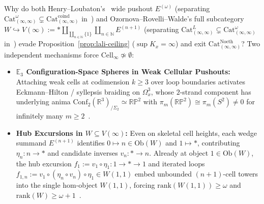 Why do both Henry--Loubaton's~\cite{HenryLoubaton25} wide pushout $E^{(\omega)}$ (separating $\mathrm{Cat}^\omega_{(\infty, \infty)} \subsetneq \mathrm{Cat}^{\mathrm{coind}}_{(\infty, \infty)}$ in~\cite[Corollary~5.56]{ORW26}) and Ozornova--Rovelli--Walde's full subcategory $W \hookrightarrow V(\infty) := * \amalg_{\coprod_{n \in \mathbb{N}} \{1\}} \coprod_{n \in \mathbb{N}} E^{(n+1)}$ (separating $\mathrm{Cat}^L_{(\infty, \infty)} \subsetneq \mathrm{Cat}^\omega_{(\infty, \infty)}$ in~\cite[\S 5]{ORW26}) evade Proposition~\ref{prop:lali-ceiling} ($\sup K_x = \infty$) and exit $\mathrm{Cat}^{\mathrm{Noeth}}_{(\infty, \infty)}$? Two independent mechanisms force $\mathrm{Cell}_\infty \not\simeq \emptyset$:
\begin{itemize}
  \item \textbf{$\mathbb{E}_3$ Configuration-Space Spheres in Weak Cellular Pushouts:} Attaching weak cells at codimension $k \ge 3$ over loop boundaries activates Eckmann--Hilton / syllepsis braiding on $\Omega^3_x$, whose $2$-strand component has underlying anima $\mathrm{Conf}_2(\mathbb{R}^3)_{/\Sigma_2} \simeq \mathbb{R}\mathbb{P}^2$ with $\pi_m(\mathbb{R}\mathbb{P}^2) \cong \pi_m(S^2) \neq 0$ for infinitely many $m \ge 2$~\cite{HenryLoubaton25,ORW26}.
  \item \textbf{Hub Excursions in $W \subseteq V(\infty)$:} Even on skeletal cell heights, each wedge summand $E^{(n+1)}$ identifies $0 \mapsto n \in \mathrm{Ob}(W)$ and $1 \mapsto *$, contributing $\eta_n : n \to *$ and candidate inverses $v_n : * \to n$. Already at object $1 \in \mathrm{Ob}(W)$, the hub excursion $f_1 := v_1 \circ \eta_1 : 1 \to * \to 1$ and iterated loops $f_{1, n} := v_1 \circ (\eta_n \circ v_n) \circ \eta_1 \in W(1, 1)$ embed unbounded $(n+1)$-cell towers into the single hom-object $W(1, 1)$, forcing $\mathrm{rank}(W(1, 1)) \ge \omega$ and $\mathrm{rank}(W) \ge \omega + 1$~\cite[\S 5]{ORW26}.
\end{itemize}

